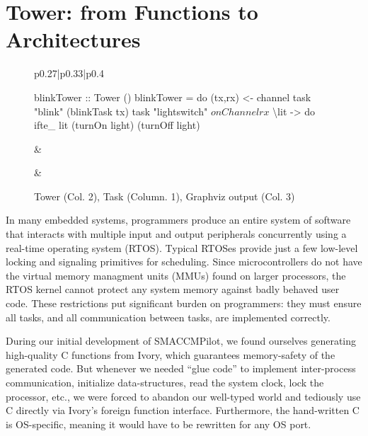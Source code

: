 \section{Tower: from Functions to Architectures}
\label{sec:tower}

\begin{figure}[hbt!]
  \begin{tabular}{p{}|p{}|p{}}
    \begin{smcode}
blinkTower :: Tower ()
blinkTower = do
  (tx,rx) <- channel
  task "blink" (blinkTask tx)
  task "lightswitch" $
    onChannel rx $
      \textbackslash{}lit -> do
        ifte_ lit (turnOn light)
                  (turnOff light)
    \end{smcode}
&
&
  \end{tabular}
  \caption{Tower (Col. 2), Task (Column. 1), Graphviz output (Col. 3)}
  \label{fig:tower-ex}
\end{figure}


In many embedded systems, programmers produce an entire system of software
that interacts with multiple input and output peripherals concurrently using a
real-time operating system (RTOS). Typical RTOSes provide just a few low-level
locking and signaling primitives for scheduling. Since microcontrollers do not
have the virtual memory managment units (MMUs) found on larger processors, the
RTOS kernel cannot protect any system memory against badly behaved user code.
These restrictions put significant burden on programmers: they must ensure all
tasks, and all communication between tasks, are implemented correctly.

During our initial development of SMACCMPilot, we found ourselves generating
high-quality C functions from Ivory, which guarantees memory-safety of the
generated code. But whenever we needed
``glue code'' to implement inter-process communication, initialize
data-structures, read the system clock, lock the processor, etc., we were forced
to abandon our well-typed world and tediously use C directly via Ivory's foreign
function interface.  Furthermore, the hand-written C is OS-specific, meaning it
would have to be rewritten for any OS port.

